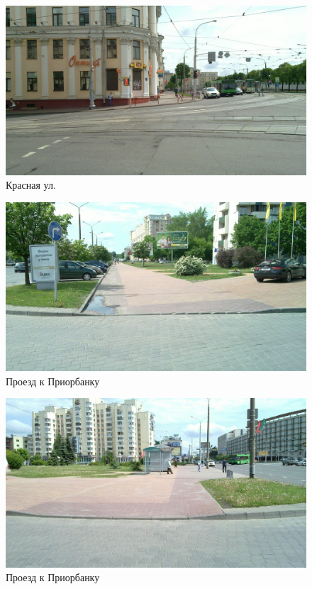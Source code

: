 \documentclass[a4paper,14pt,twoside]{extarticle}
\begin{document}
\begin{figure}[h!]
    \centering
    \includegraphics[width=\textwidth]{Pictures/1000000000000A00000005A0862511C0.jpg}
    \caption{Красная ул.}
\end{figure}

\begin{figure}[h!]
    \centering
    \includegraphics[width=\textwidth]{Pictures/1000000000000A00000005A038E55DC7.jpg}
    \caption{Проезд к Приорбанку}
\end{figure}

\begin{figure}[h!]
    \centering
    \includegraphics[width=\textwidth]{Pictures/1000000000000A00000005A0FD36DCD5.jpg}
    \caption{Проезд к Приорбанку}
\end{figure}
\end{document}
